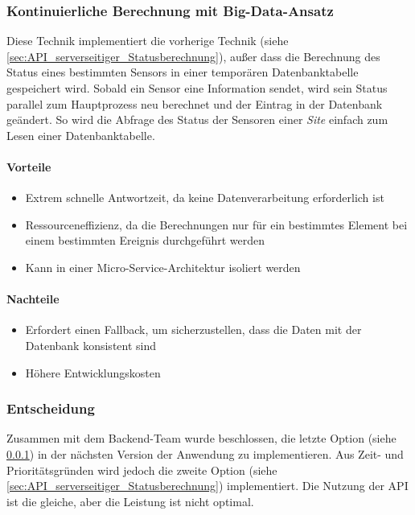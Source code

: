 \subsubsection{Kontinuierliche Berechnung mit Big-Data-Ansatz} \label{sec:API_bigdata}

Diese Technik implementiert die vorherige Technik (siehe \ref{sec:API_serverseitiger_Statusberechnung}), außer dass die Berechnung des Status eines bestimmten Sensors in einer temporären Datenbanktabelle gespeichert wird.
Sobald ein Sensor eine Information sendet, wird sein Status parallel zum Hauptprozess neu berechnet und der Eintrag in der Datenbank geändert.
So wird die Abfrage des Status der Sensoren einer \textit{Site} einfach zum Lesen einer Datenbanktabelle.

\paragraph{Vorteile}
\begin{itemize}
  \item Extrem schnelle Antwortzeit, da keine Datenverarbeitung erforderlich ist
  \item Ressourceneffizienz, da die Berechnungen nur für ein bestimmtes Element bei einem bestimmten Ereignis durchgeführt werden
  \item Kann in einer Micro-Service-Architektur isoliert werden
\end{itemize}

\paragraph{Nachteile}
\begin{itemize}
  \item Erfordert einen Fallback, um sicherzustellen, dass die Daten mit der Datenbank konsistent sind
  \item Höhere Entwicklungskosten
\end{itemize}

\subsubsection{Entscheidung}

Zusammen mit dem Backend-Team wurde beschlossen, die letzte Option (siehe \ref{sec:API_bigdata}) in der nächsten Version der Anwendung zu implementieren.
Aus Zeit- und Prioritätsgründen wird jedoch die zweite Option (siehe \ref{sec:API_serverseitiger_Statusberechnung}) implementiert.
Die Nutzung der API ist die gleiche, aber die Leistung ist nicht optimal.

